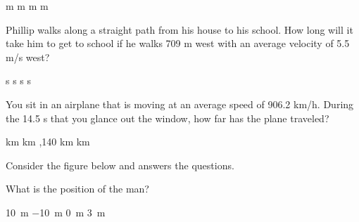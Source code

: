 \documentclass[addpoints]{exam}
\begin{document}
\begin{questions}
\begin{choices}
 m
 m
 m
 m
\end{choices}

\question %
Phillip walks along a straight path from his house to his school. How long will it take him to get to school if he walks 709 m west with an average velocity of 5.5 m/s west?


\begin{choices}
 s
 s
 s
 s
\end{choices}



\question %
You sit in an airplane that is moving at an average speed of 906.2 km/h. During the 14.5 s that you glance out the window, how far has the plane traveled?

\begin{choices}
 km
 km
,140 km
 km
\end{choices}



\begin{EnvUplevel}
    Consider the figure below and answers the questions.
\end{EnvUplevel}


\begin{figure}[h!]
    \centering
\end{figure}

\question
What is the position of the man?

\begin{choices}
    \choice \SI{10}{m}
    \choice \SI{-10}{m}
    \choice \SI{0}{m}
    \choice \SI{3}{m}
\end{choices}


\end{questions}
\end{document}
